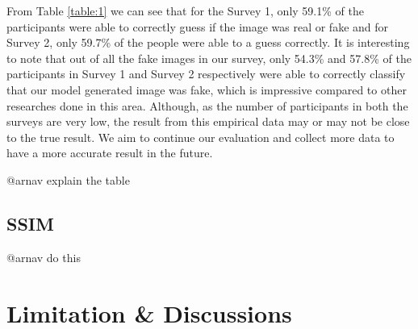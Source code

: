 \documentclass{article}
\begin{document}
From Table \ref{table:1} we can see that for the Survey 1, only 59.1\% of the participants were able to correctly guess if the image was real or fake and for Survey 2, only 59.7\% of the people were able to a guess correctly. It is interesting to note that out of all the fake images in our survey, only 54.3\% and 57.8\% of the participants in Survey 1 and  Survey 2 respectively were able to correctly classify that our model generated image was fake, which is impressive compared to other researches done in this area. Although, as the number of participants in both the surveys are very low, the result from this empirical data may or may not be close to the true result. We aim to continue our evaluation and collect more data to have a more accurate result in the future.

@arnav explain the table

\subsection{SSIM}

@arnav do this

\section{Limitation \& Discussions}
\end{document}
